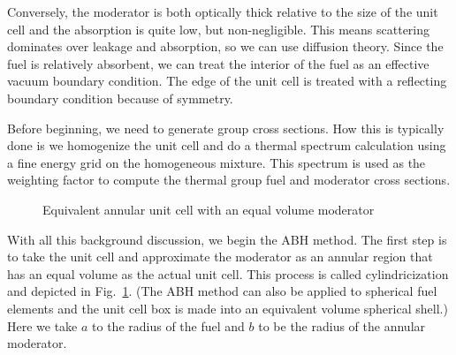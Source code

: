 Conversely, the moderator is both optically thick relative to the size of the unit cell and the absorption is quite low, but non-negligible. This means scattering dominates over leakage and absorption, so we can use diffusion theory. Since the fuel is relatively absorbent, we can treat the interior of the fuel as an effective vacuum boundary condition. The edge of the unit cell is treated with a reflecting boundary condition because of symmetry.

Before beginning, we need to generate group cross sections. How this is typically done is we homogenize the unit cell and do a thermal spectrum calculation using a fine energy grid on the homogeneous mixture. This spectrum is used as the weighting factor to compute the thermal group fuel and moderator cross sections.


\begin{figure}[tb!]
\begin{center}
\begin{center}
\end{center}
\caption{Equivalent annular unit cell with an equal volume moderator}
\label{Fig:thermalization_cylindricizedUnitCell}
\end{center}
\end{figure}

With all this background discussion, we begin the ABH method. The first step is to take the unit cell and approximate the moderator as an annular region that has an equal volume as the actual unit cell. This process is called cylindricization and depicted in Fig.~\ref{Fig:thermalization_cylindricizedUnitCell}. (The ABH method can also be applied to spherical fuel elements and the unit cell box is made into an equivalent volume spherical shell.) Here we take $a$ to the radius of the fuel and $b$ to be the radius of the annular moderator.

